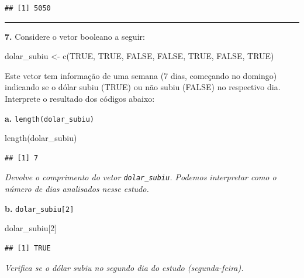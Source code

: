 \documentclass[
]{book}
\newenvironment{Shaded}{\begin{snugshade}}{\end{snugshade}}
\newcommand{\ConstantTok}[1]{\textcolor[rgb]{0.00,0.00,0.00}{#1}}
\newcommand{\DecValTok}[1]{\textcolor[rgb]{0.00,0.00,0.81}{#1}}
\newcommand{\FunctionTok}[1]{\textcolor[rgb]{0.00,0.00,0.00}{#1}}
\newcommand{\NormalTok}[1]{#1}
\newcommand{\OtherTok}[1]{\textcolor[rgb]{0.56,0.35,0.01}{#1}}
\begin{document}
\begin{verbatim}
## [1] 5050
\end{verbatim}

\begin{center}\rule{0.5\linewidth}{0.5pt}\end{center}

\textbf{7.} Considere o vetor booleano a seguir:

\begin{Shaded}
\begin{Highlighting}[]
\NormalTok{dolar\_subiu }\OtherTok{\textless{}{-}} \FunctionTok{c}\NormalTok{(}\ConstantTok{TRUE}\NormalTok{, }\ConstantTok{TRUE}\NormalTok{, }\ConstantTok{FALSE}\NormalTok{, }\ConstantTok{FALSE}\NormalTok{, }\ConstantTok{TRUE}\NormalTok{, }\ConstantTok{FALSE}\NormalTok{, }\ConstantTok{TRUE}\NormalTok{)}
\end{Highlighting}
\end{Shaded}

Este vetor tem informação de uma semana (7 dias, começando no domingo) indicando se o dólar subiu (TRUE) ou não subiu (FALSE) no respectivo dia. Interprete o resultado dos códigos abaixo:

\textbf{a.} \texttt{length(dolar\_subiu)}

\begin{Shaded}
\begin{Highlighting}[]
\FunctionTok{length}\NormalTok{(dolar\_subiu)}
\end{Highlighting}
\end{Shaded}

\begin{verbatim}
## [1] 7
\end{verbatim}

\emph{Devolve o comprimento do vetor \texttt{dolar\_subiu}. Podemos interpretar como o número de dias analisados nesse estudo.}

\textbf{b.} \texttt{dolar\_subiu{[}2{]}}

\begin{Shaded}
\begin{Highlighting}[]
\NormalTok{dolar\_subiu[}\DecValTok{2}\NormalTok{]}
\end{Highlighting}
\end{Shaded}

\begin{verbatim}
## [1] TRUE
\end{verbatim}

\emph{Verifica se o dólar subiu no segundo dia do estudo (segunda-feira).}
\end{document}
